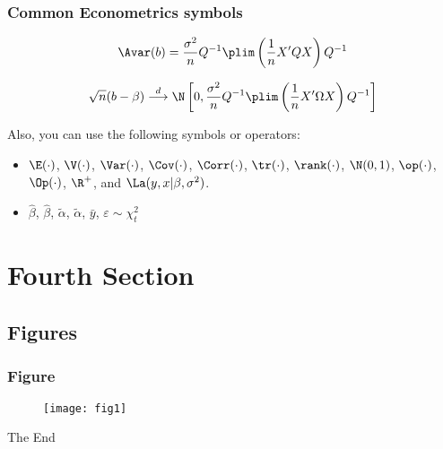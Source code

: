 \documentclass[aspectratio=169,xcolor=dvipsnames]{beamer}
\begin{document}
\begin{frame}
    \frametitle{Common Econometrics symbols}

    \begin{equation}
        \Avar (b) = \frac{\sigma^2}{n} Q^{-1} \plim \left( \frac{1}{n}X'QX \right)Q^{-1}
    \end{equation}

    \begin{equation}
        \sqrt{n}(b-\beta) \stackrel{d}{\longrightarrow} \N \left[0,\frac{\sigma^2}{n} Q^{-1} \plim \left( \frac{1}{n}X'\Omega X\right)Q^{-1}\right]
    \end{equation}

    Also, you can use the following symbols or operators:
    \begin{itemize}
        \item $\E(\cdot)$, $\V(\cdot)$, $\Var(\cdot)$, $\Cov(\cdot)$, $\Corr(\cdot)$, $\tr(\cdot)$, $\rank(\cdot)$, $\N(0,1)$, $\op(\cdot)$, $\Op(\cdot)$, $\R^+$, and $\La(y,x|\beta,\sigma^2)$.
        \item $\hat \beta$, $\widehat \beta$, $\tilde \alpha$, $\widetilde \alpha$, $\bar y$, $\varepsilon \sim \chi^2_t$
    \end{itemize}

\end{frame}

\section{Fourth Section}

\subsection{Figures}


\begin{frame}
    \frametitle{Figure}

    \begin{figure}
        \texttt{[image: fig1]}
    \end{figure}
\end{frame}


\begin{frame}
    \Huge{\centerline{The End}}
\end{frame}

\end{document}
